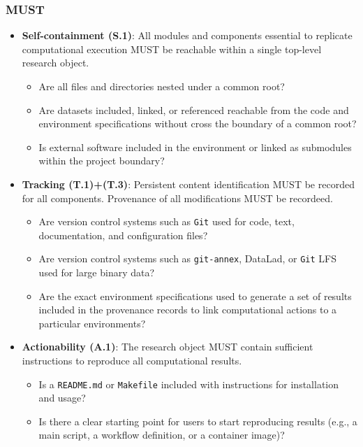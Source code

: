 \documentclass{article}
\begin{document}
\subsubsection*{MUST}
\begin{itemize}[label=$\triangleright$]
    \item \textbf{Self-containment (S.1)}: All modules and components essential to replicate computational execution MUST be reachable within a single top-level research object.
    \begin{itemize}[label=$\square$]
        \item Are all files and directories nested under a common root?
        \item Are datasets included, linked, or referenced reachable from the code and environment specifications without cross the boundary of a common root?
        \item Is external software included in the environment or linked as submodules within the project boundary?
    \end{itemize}
    \item \textbf{Tracking (T.1)+(T.3)}: Persistent content identification MUST be recorded for all components. Provenance of all modifications MUST be recordeed.
    \begin{itemize}[label=$\square$]
        \item Are version control systems such as \texttt{Git} used for code, text, documentation, and configuration files?
        \item Are version control systems such as \texttt{git-annex}, DataLad, or \texttt{Git} LFS used for large binary data?
        \item Are the exact environment specifications used to generate a set of results included in the provenance records to link computational actions to a particular environments?
    \end{itemize}
    \item \textbf{Actionability (A.1)}: The research object MUST contain sufficient instructions to reproduce all computational results.
    \begin{itemize}[label=$\square$]
        \item Is a \texttt{README.md} or \texttt{Makefile} included with instructions for installation and usage?
        \item Is there a clear starting point for users to start reproducing results (e.g., a main script, a workflow definition, or a container image)?
    \end{itemize}

\end{itemize}
\end{document}
